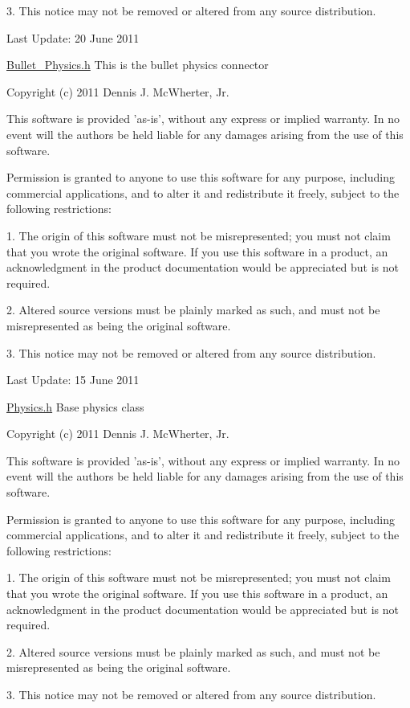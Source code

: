 3. This notice may not be removed or altered from any source distribution.

Last Update: 20 June 2011

\hyperlink{_bullet___physics_8h_source}{Bullet\_\-Physics.h} This is the bullet physics connector

Copyright (c) 2011 Dennis J. McWherter, Jr.

This software is provided 'as-\/is', without any express or implied warranty. In no event will the authors be held liable for any damages arising from the use of this software.

Permission is granted to anyone to use this software for any purpose, including commercial applications, and to alter it and redistribute it freely, subject to the following restrictions:

1. The origin of this software must not be misrepresented; you must not claim that you wrote the original software. If you use this software in a product, an acknowledgment in the product documentation would be appreciated but is not required.

2. Altered source versions must be plainly marked as such, and must not be misrepresented as being the original software.

3. This notice may not be removed or altered from any source distribution.

Last Update: 15 June 2011

\hyperlink{_physics_8h_source}{Physics.h} Base physics class

Copyright (c) 2011 Dennis J. McWherter, Jr.

This software is provided 'as-\/is', without any express or implied warranty. In no event will the authors be held liable for any damages arising from the use of this software.

Permission is granted to anyone to use this software for any purpose, including commercial applications, and to alter it and redistribute it freely, subject to the following restrictions:

1. The origin of this software must not be misrepresented; you must not claim that you wrote the original software. If you use this software in a product, an acknowledgment in the product documentation would be appreciated but is not required.

2. Altered source versions must be plainly marked as such, and must not be misrepresented as being the original software.

3. This notice may not be removed or altered from any source distribution.


